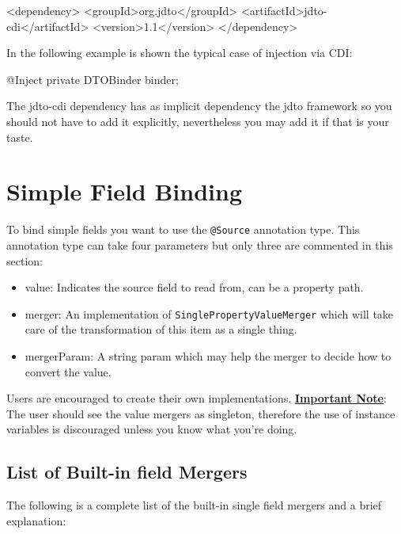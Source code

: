 \documentclass[11pt]{article}
\begin{document}

\begin{xml}
    <dependency>
        <groupId>org.jdto</groupId>
        <artifactId>jdto-cdi</artifactId>
        <version>1.1</version>
    </dependency>
\end{xml}

In the following example is shown the typical case of injection via CDI:


\begin{java}
@Inject
private DTOBinder binder;
\end{java}

The jdto-cdi dependency has as implicit dependency the jdto framework so you should not have to add it explicitly, nevertheless you may add it if that is your taste.
 

\section{Simple Field Binding}


To bind simple fields you want to use the \texttt{@Source} annotation type.
This annotation type can take four parameters but only three are commented in this section:

\begin{itemize}
 \item value: Indicates the source field to read from, can be a property path.
 \item merger: An implementation of \texttt{SinglePropertyValueMerger} which will take care of the transformation of this item as a single thing.
 \item mergerParam: A string param which may help the merger to decide how to convert the value.
\end{itemize}

Users are encouraged to create their own implementations. \textbf{\underline{Important Note}}: The user should see
the value mergers as singleton, therefore the use of instance variables is discouraged unless you know what you're doing.


\subsection{List of Built-in field Mergers}


The following is a complete list of the built-in single field mergers and a brief explanation:
\end{document}
